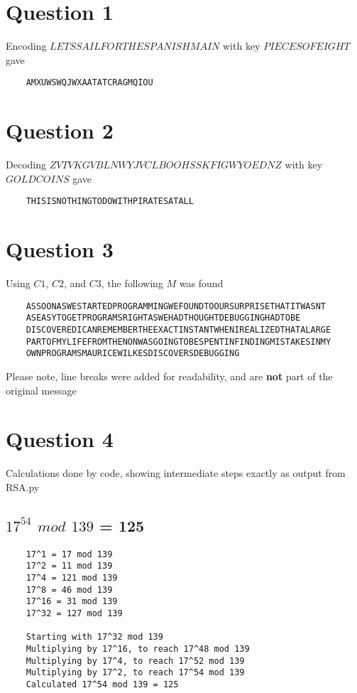 \documentclass[a4paper,12pt]{article}
\begin{document}
\section*{Question 1}
Encoding $LETSSAILFORTHESPANISHMAIN$ with key $PIECESOFEIGHT$ gave \\
\begin{verbatim}
    AMXUWSWQJWXAATATCRAGMQIOU
\end{verbatim}

\section*{Question 2}
Decoding $ZVTVKGVBLNWYJVCLBOOHSSKFIGWYOEDNZ$ with key $GOLDCOINS$ gave \\
\begin{verbatim}
    THISISNOTHINGTODOWITHPIRATESATALL
\end{verbatim}

\section*{Question 3}
Using $C1$, $C2$, and $C3$, the following $M$ was found
\begin{verbatim}
    ASSOONASWESTARTEDPROGRAMMINGWEFOUNDTOOURSURPRISETHATITWASNT
    ASEASYTOGETPROGRAMSRIGHTASWEHADTHOUGHTDEBUGGINGHADTOBE
    DISCOVEREDICANREMEMBERTHEEXACTINSTANTWHENIREALIZEDTHATALARGE
    PARTOFMYLIFEFROMTHENONWASGOINGTOBESPENTINFINDINGMISTAKESINMY
    OWNPROGRAMSMAURICEWILKESDISCOVERSDEBUGGING
\end{verbatim}
Please note, line breaks were added for readability, and are \textbf{not} part of the original message

\section*{Question 4}
Calculations done by code, showing intermediate steps exactly as output from RSA.py
\subsection*{$17^{54}$ $mod$ $139$ = 125}
\begin{verbatim}
    17^1 = 17 mod 139
    17^2 = 11 mod 139
    17^4 = 121 mod 139
    17^8 = 46 mod 139
    17^16 = 31 mod 139
    17^32 = 127 mod 139

    Starting with 17^32 mod 139
    Multiplying by 17^16, to reach 17^48 mod 139
    Multiplying by 17^4, to reach 17^52 mod 139
    Multiplying by 17^2, to reach 17^54 mod 139
    Calculated 17^54 mod 139 = 125
\end{verbatim}
\end{document}
